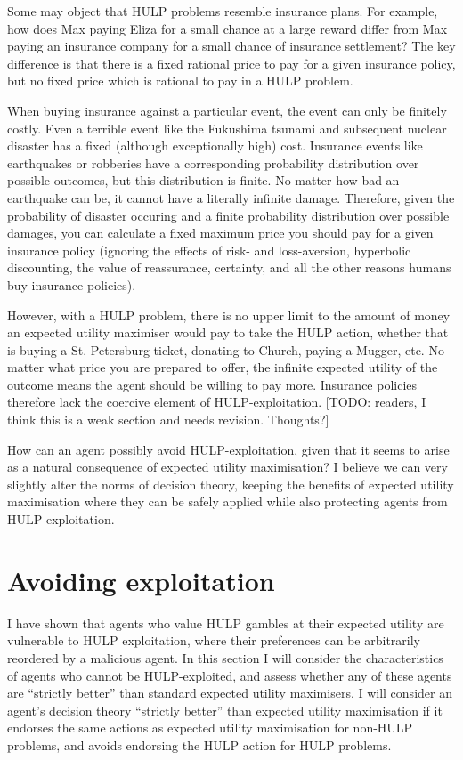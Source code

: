 \documentclass{article}
\begin{document}
Some may object that HULP problems resemble insurance plans. For example, how does Max paying Eliza for a small chance at a large reward differ from Max paying an insurance company for a small chance of insurance settlement? The key difference is that there is a fixed rational price to pay for a given insurance policy, but no fixed price which is rational to pay in a HULP problem.

When buying insurance against a particular event, the event can only be finitely costly. Even a terrible event like the Fukushima tsunami and subsequent nuclear disaster has a fixed (although exceptionally high) cost. Insurance events like earthquakes or robberies have a corresponding probability distribution over possible outcomes, but this distribution is finite. No matter how bad an earthquake can be, it cannot have a literally infinite damage. Therefore, given the probability of disaster occuring and a finite probability distribution over possible damages, you can calculate a fixed maximum price you should pay for a given insurance policy (ignoring the effects of risk- and loss-aversion, hyperbolic discounting, the value of reassurance, certainty, and all the other reasons humans buy insurance policies). 

However, with a HULP problem, there is no upper limit to the amount of money an expected utility maximiser would pay to take the HULP action, whether that is buying a St. Petersburg ticket, donating to Church, paying a Mugger, etc. No matter what price you are prepared to offer, the infinite expected utility of the outcome means the agent should be willing to pay more. Insurance policies therefore lack the coercive element of HULP-exploitation. [TODO: readers, I think this is a weak section and needs revision. Thoughts?]

How can an agent possibly avoid HULP-exploitation, given that it seems to arise as a natural consequence of expected utility maximisation? I believe we can very slightly alter the norms of decision theory, keeping the benefits of expected utility maximisation where they can be safely applied while also protecting agents from HULP exploitation.

\section{Avoiding exploitation}

I have shown that agents who value HULP gambles at their expected utility are vulnerable to HULP exploitation, where their preferences can be arbitrarily reordered by a malicious agent. In this section I will consider the characteristics of agents who cannot be HULP-exploited, and assess whether any of these agents are ``strictly better'' than standard expected utility maximisers. I will consider an agent's decision theory ``strictly better'' than expected utility maximisation if it endorses the same actions as expected utility maximisation for non-HULP problems, and avoids endorsing the HULP action for HULP problems.
\end{document}
